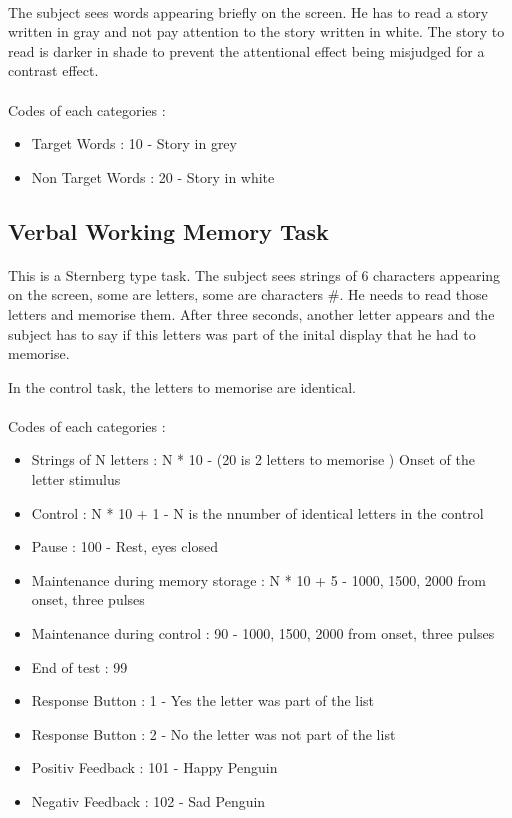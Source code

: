 \documentclass[a4paper]{article}
\begin{document}
\paragraph{} The subject sees words appearing briefly on the screen.  He has to read a story written in gray and not pay attention to the story written in white. 
The story to read is darker in shade to prevent the attentional effect being misjudged for a contrast effect. 
\paragraph{}
Codes of each categories :

\begin{itemize}
\item Target Words : 10 - Story in grey 
\item Non Target Words : 20 - Story in white
\end{itemize}

\subsection{Verbal Working Memory Task} \label{locamveb}   
\paragraph{} This is a Sternberg type task. The subject sees strings of 6 characters appearing on the screen, some are letters, some are characters {\#}. He needs to read those letters and memorise them. After three seconds,  another letter appears and the subject has to say if this letters was part of the inital display that he had to memorise.

In the control task,  the letters to memorise are identical.

\paragraph{}
Codes of each categories :

\begin{itemize}
\item Strings of N letters : N * 10 - (20 is 2 letters to memorise ) Onset of the letter stimulus 
\item Control : N * 10 + 1 - N is the nnumber of identical letters in the control
\item Pause : 100 - Rest, eyes closed
\item Maintenance during memory storage : N * 10 + 5 - 1000, 1500, 2000 from onset,  three pulses
\item Maintenance during control  : 90 - 1000, 1500, 2000 from onset,  three pulses
\item End of test : 99
\item Response Button : 1 - Yes the letter was part of the list
\item Response Button : 2 - No the letter was not part of the list
\item Positiv Feedback : 101 - Happy Penguin
\item Negativ Feedback : 102 - Sad Penguin 
\end{itemize}
\end{document}
